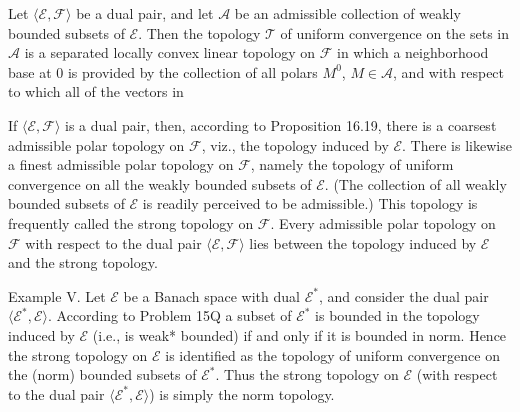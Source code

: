 Let $\langle \mathcal{E}, \mathcal{F} \rangle$ be a dual pair, and let $\mathcal{A}$ be an admissible collection of weakly bounded subsets of $\mathcal{E}$. Then the topology $\mathcal{T}$ of uniform convergence on the sets in $\mathcal{A}$ is a separated locally convex linear topology on $\mathcal{F}$ in which a neighborhood base at 0 is provided by the collection of all polars $M^0$, $M \in \mathcal{A}$, and with respect to which all of the vectors in

If $\langle \mathcal{E}, \mathcal{F} \rangle$ is a dual pair, then, according to Proposition 16.19, there is a coarsest admissible polar topology on $\mathcal{F}$, viz., the topology induced by $\mathcal{E}$. There is likewise a finest admissible polar topology on $\mathcal{F}$, namely the topology of uniform convergence on all the weakly bounded subsets of $\mathcal{E}$. (The collection of all weakly bounded subsets of $\mathcal{E}$ is readily perceived to be admissible.) This topology is frequently called the strong topology on $\mathcal{F}$. Every admissible polar topology on $\mathcal{F}$ with respect to the dual pair $\langle \mathcal{E}, \mathcal{F} \rangle$ lies between the topology induced by $\mathcal{E}$ and the strong topology.

Example V. Let $\mathcal{E}$ be a Banach space with dual $\mathcal{E}^*$, and consider the dual pair $\langle \mathcal{E}^*, \mathcal{E} \rangle$. According to Problem 15Q a subset of $\mathcal{E}^*$ is bounded in the topology induced by $\mathcal{E}$ (i.e., is weak* bounded) if and only if it is bounded in norm. Hence the strong topology on $\mathcal{E}$ is identified as the topology of uniform convergence on the (norm) bounded subsets of $\mathcal{E}^*$. Thus the strong topology on $\mathcal{E}$ (with respect to the dual pair $\langle \mathcal{E}^*, \mathcal{E} \rangle$) is simply the norm topology.
